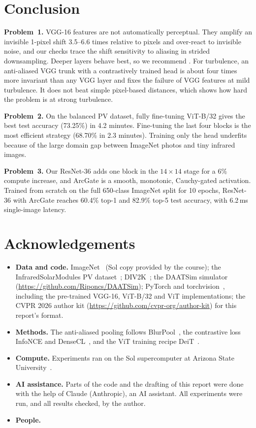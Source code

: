 \section{Conclusion}
\label{sec:conclusion}

\textbf{Problem~1.}
VGG-16 features are not automatically perceptual.
They amplify an invisible 1-pixel shift 3.5--6.6 times relative to pixels and over-react to invisible noise, and our checks trace the shift sensitivity to aliasing in strided downsampling.
Deeper layers behave best, so we recommend .
For turbulence, an anti-aliased VGG trunk with a contrastively trained head is about four times more invariant than any VGG layer and fixes the failure of VGG features at mild turbulence.
It does not beat simple pixel-based distances, which shows how hard the problem is at strong turbulence.

\textbf{Problem~2.}
On the balanced PV dataset, fully fine-tuning ViT-B/32 gives the best test accuracy (73.25\%) in 4.2 minutes.
Fine-tuning the last four blocks is the most efficient strategy (68.70\% in 2.3 minutes).
Training only the head underfits because of the large domain gap between ImageNet photos and tiny infrared images.

\textbf{Problem~3.}
Our ResNet-36 adds one block in the $14\times14$ stage for a 6\% compute increase, and ArcGate is a smooth, monotonic, Cauchy-gated activation.
Trained from scratch on the full 650-class ImageNet split for 10 epochs, ResNet-36 with ArcGate reaches 60.4\% top-1 and 82.9\% top-5 test accuracy, with 6.2\,ms single-image latency.

\section*{Acknowledgements}
\begin{itemize}[nosep,leftmargin=*]
  \item \textbf{Data and code.} ImageNet~\cite{deng2009imagenet} (Sol copy provided by the course); the InfraredSolarModules PV dataset~\cite{millendorf2020pv}; DIV2K~\cite{agustsson2017div2k}; the DAATSim simulator~\cite{saha2025daatsim} (\url{https://github.com/Riponcs/DAATSim}); PyTorch and torchvision~\cite{paszke2019pytorch}, including the pre-trained VGG-16, ViT-B/32 and ViT implementations; the CVPR 2026 author kit (\url{https://github.com/cvpr-org/author-kit}) for this report's format.
  \item \textbf{Methods.} The anti-aliased pooling follows BlurPool~\cite{zhang2019blurpool}, the contrastive loss InfoNCE and DenseCL~\cite{oord2018cpc,wang2021densecl}, and the ViT training recipe DeiT~\cite{touvron2021deit}.
  \item \textbf{Compute.} Experiments ran on the Sol supercomputer at Arizona State University~\cite{jennewein2023sol}.
  \item \textbf{AI assistance.} Parts of the code and the drafting of this report were done with the help of Claude (Anthropic), an AI assistant. All experiments were run, and all results checked, by the author.
  \item \textbf{People.} 
\end{itemize}
